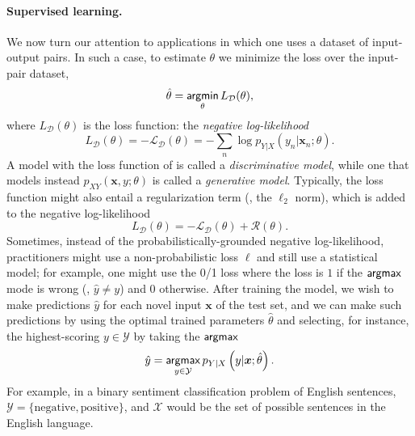 \paragraph*{Supervised learning.} We now turn our attention to applications
in which one uses a dataset of input-output pairs. In such a case,
to estimate $\theta$ we minimize the loss over the input-pair dataset,
%
\begin{equation}
    \hat{\theta} = \operatorname*{\mathsf{argmin}}_\theta L_\mathcal{D}(\theta),
\end{equation}
%
where $L_\mathcal{D}(\theta)$ is the loss function:
the \textit{negative log-likelihood}
%
\begin{equation}
    L_\mathcal{D}(\theta) = -\mathcal{L}_\mathcal{D}(\theta) =
    - \sum_n \log p_{Y|X}(y_n|\bm{x}_n; \theta).
    \label{eq:discr-loss}
\end{equation}
%
A model with the loss function of  is called a
\textit{discriminative model}, while one that models instead
$p_{XY}(\bm{x}, y; \theta)$ is called a \textit{generative model}.
Typically, the loss function might also entail a regularization term (\eg, the $\ell_2$ norm),
which is added to the negative log-likelihood
%
\begin{equation}
    L_\mathcal{D}(\theta) = -\mathcal{L}_\mathcal{D}(\theta) + \mathcal{R}(\theta).
\end{equation}
%
Sometimes, instead of the probabilistically-grounded negative
log-likelihood, practitioners might use a non-probabilistic loss $\ell$ and
still use a statistical model; for example, one might use the 0/1
loss where the loss is $1$ if the $\operatorname*{\mathsf{argmax}}$ mode is wrong (\ie,
$\hat{y}\neq y$) and $0$ otherwise. After training the model, we wish
to make predictions $\hat{y}$ for each novel input $\bm{x}$ of the
test set, and we can make such predictions by using the optimal
trained parameters $\hat{\theta}$ and selecting, for instance, the highest-scoring
$y\in\mathcal{Y}$ by taking the $\operatorname*{\mathsf{argmax}}$
%
\begin{equation}
    \hat{y}=\operatorname*{\mathsf{argmax}}_{y\in\mathcal{Y}}p_{Y|X}\left(y|\bm{x};\hat{\theta}\right).
\end{equation}
%
For example, in a binary sentiment classification problem of English
sentences, $\mathcal{Y}=\{\text{negative},\text{positive}\}$, and
$\mathcal{X}$ would be the set of possible sentences in the English
language.

